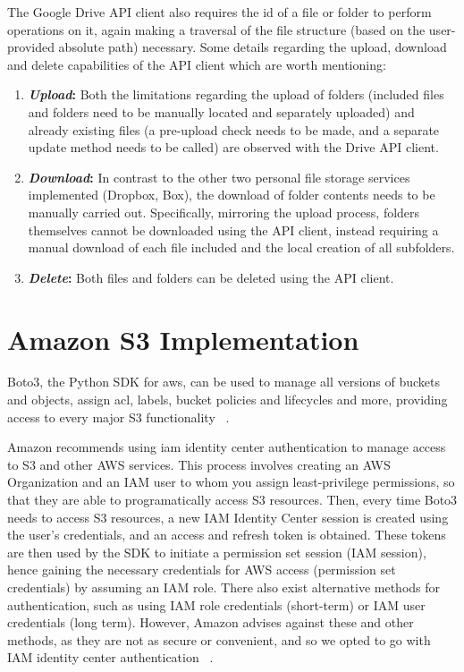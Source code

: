 The Google Drive API client also requires the id of a file or folder to perform operations on it, again making a traversal of the file structure (based on the user-provided absolute path) necessary. Some details regarding the upload, download and delete capabilities of the API client which are worth mentioning: ~\cite{drive_docs}

\begin{enumerate}
	\item \textbf{\textit{Upload}:} Both the limitations regarding the upload of folders  (included files and folders need to be manually located and separately uploaded) and already existing files (a pre-upload check needs to be made, and a separate update method needs to be called) are observed with the Drive API client. 
	
	\item \textbf{\textit{Download}:} In contrast to the other two personal file storage services implemented (Dropbox, Box), the download of folder contents needs to be manually carried out. Specifically, mirroring the upload process, folders themselves cannot be downloaded using the API client, instead requiring a manual download of each file included and the local creation of all subfolders. 
	
	\item \textbf{\textit{Delete}:} Both files and folders can be deleted using the API client.
\end{enumerate}


\section{Amazon S3 Implementation}
Boto3, the Python SDK for \ac{aws},  can be used to manage all versions of buckets and objects, assign \ac{acl}, labels, bucket policies and lifecycles and more, providing access to every major S3 functionality ~\cite{s3_docs}. 

Amazon recommends using \ac{iam} identity center authentication to manage access to S3 and other AWS services. This process involves creating an AWS Organization and an IAM user to whom you assign least-privilege permissions, so that they are able to programatically access S3 resources. Then, every time Boto3 needs to access S3 resources, a new IAM Identity Center session is created using the user's credentials, and an access and refresh token is obtained. These tokens are then used by the SDK to initiate a permission set session (IAM session), hence gaining the necessary credentials for AWS access (permission set credentials) by assuming an IAM role. There also exist alternative methods for authentication, such as using IAM role credentials (short-term) or IAM user credentials (long term). However, Amazon advises against these and other methods, as they are not as secure or convenient, and so we opted to go with IAM identity center authentication ~\cite{s3_auth}.

